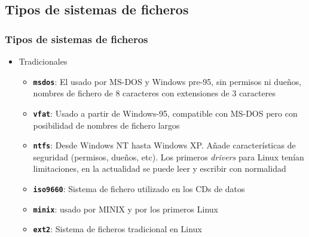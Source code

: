 \documentclass[ucs]{beamer}
\begin{document}
  \subsection{Tipos de sistemas de ficheros}
\begin{frame}[fragile]
  \frametitle{Tipos de sistemas de ficheros}
  \begin{itemize}
  \item Tradicionales
    \begin{itemize}
    \item \texttt{\textbf{msdos}}: El usado por MS-DOS y Windows
      pre-95, sin permisos ni dueños, nombres de fichero de 8
      caracteres con extensiones de 3 caracteres
    \item \texttt{\textbf{vfat}}: Usado a partir de Windows-95,
      compatible con MS-DOS pero con posibilidad de nombres de fichero
      largos
    \item \texttt{\textbf{ntfs}}: Desde Windows NT hasta Windows XP. Añade
      características de seguridad (permisos, dueños, etc). Los primeros 
     \emph{drivers} para Linux tenían limitaciones, en la actualidad se puede
      leer y escribir con normalidad 
    \item \texttt{\textbf{iso9660}}: Sistema de fichero utilizado en
      los CDs de datos
    \item \texttt{\textbf{minix}}: usado por MINIX y por los
      primeros Linux
    \item \texttt{\textbf{ext2}}: Sistema de ficheros tradicional    
      en Linux
    \end{itemize}
  \end{itemize}
\end{frame}
\end{document}
